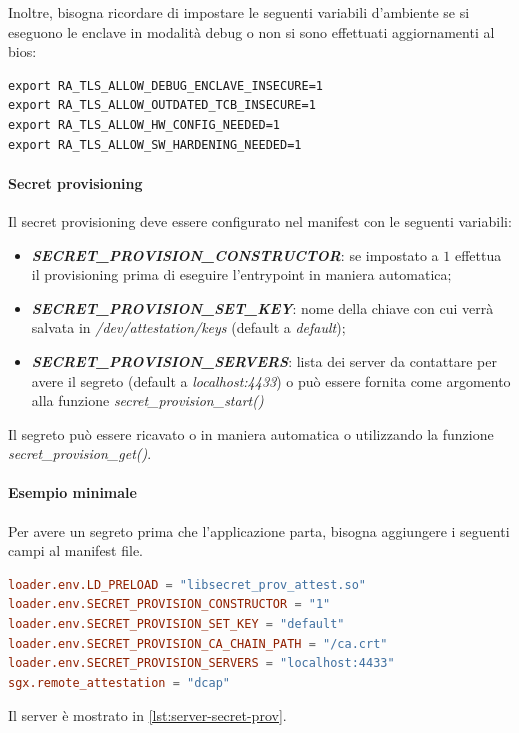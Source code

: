 \documentclass{article}
\begin{document}
Inoltre, bisogna ricordare di impostare le seguenti variabili d'ambiente se si eseguono le enclave in modalità debug o non si sono effettuati aggiornamenti al bios:
\begin{verbatim}
export RA_TLS_ALLOW_DEBUG_ENCLAVE_INSECURE=1
export RA_TLS_ALLOW_OUTDATED_TCB_INSECURE=1
export RA_TLS_ALLOW_HW_CONFIG_NEEDED=1
export RA_TLS_ALLOW_SW_HARDENING_NEEDED=1 
\end{verbatim}

\paragraph{Secret provisioning}
Il secret provisioning deve essere configurato nel manifest con le seguenti variabili:
\begin{itemize}
  \item \textbf{\textit{SECRET\_PROVISION\_CONSTRUCTOR}}: se impostato a $1$ effettua il provisioning prima di eseguire l'entrypoint in maniera automatica;
  \item \textbf{\textit{SECRET\_PROVISION\_SET\_KEY}}: nome della chiave con cui verrà salvata in \textit{/dev/attestation/keys} (default a \textit{default});
  \item \textbf{\textit{SECRET\_PROVISION\_SERVERS}}: lista dei server da contattare per avere il segreto (default a \textit{localhost:4433}) o può essere fornita come argomento alla funzione \textit{secret\_provision\_start()}
\end{itemize}
Il segreto può essere ricavato o in maniera automatica o utilizzando la funzione \textit{secret\_provision\_get()}.

\paragraph{Esempio minimale}
Per avere un segreto prima che l'applicazione parta, bisogna aggiungere i seguenti campi al manifest file.
\begin{lstlisting}[language=Toml,caption=Caricamento di un segreto prima che l'applicazione parta]
loader.env.LD_PRELOAD = "libsecret_prov_attest.so"
loader.env.SECRET_PROVISION_CONSTRUCTOR = "1"
loader.env.SECRET_PROVISION_SET_KEY = "default"
loader.env.SECRET_PROVISION_CA_CHAIN_PATH = "/ca.crt"
loader.env.SECRET_PROVISION_SERVERS = "localhost:4433"
sgx.remote_attestation = "dcap"
\end{lstlisting}

Il server è mostrato in \cref{lst:server-secret-prov}.

\end{document}

